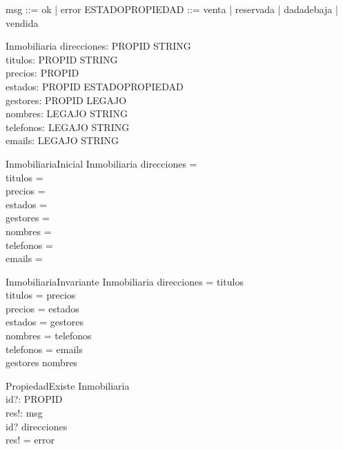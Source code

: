 \begin{zed}
\also
msg ::= ok | error
\also
ESTADOPROPIEDAD ::= venta | reservada | dadadebaja | vendida
\end{zed}

\begin{schema}{Inmobiliaria}
direcciones: PROPID \pfun STRING \\
titulos: PROPID \pfun STRING \\
precios: PROPID \pfun \nat \\
estados: PROPID \pfun ESTADOPROPIEDAD \\
gestores: PROPID \pfun LEGAJO \\

nombres: LEGAJO \pfun STRING \\
telefonos: LEGAJO \pfun STRING \\
emails: LEGAJO \pfun STRING \\
\end{schema}

\begin{schema}{InmobiliariaInicial}
Inmobiliaria
\where
direcciones =  \emptyset  \\
titulos =  \emptyset  \\
precios =  \emptyset  \\
estados =  \emptyset  \\
gestores =  \emptyset  \\

nombres =  \emptyset  \\
telefonos =  \emptyset  \\
emails =  \emptyset  \\
\end{schema}

\begin{schema}{InmobiliariaInvariante}
Inmobiliaria
\where
\dom direcciones = \dom titulos \\
\dom titulos = \dom precios \\
\dom precios = \dom estados \\
\dom estados = \dom gestores \\

\dom nombres = \dom telefonos \\
\dom telefonos = \dom emails \\

\ran gestores \subseteq \dom nombres \\
\end{schema}

\begin{schema}{PropiedadExiste}
\Xi Inmobiliaria \\
id?: PROPID \\
res!: msg \\
\where
id? \in \dom direcciones \\
res! = error \\
\end{schema}

